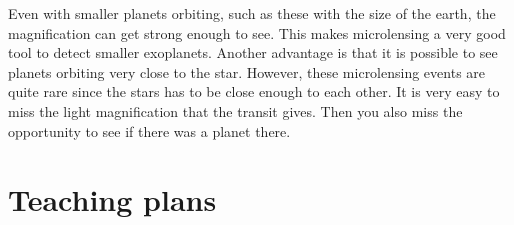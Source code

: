 \documentclass[12pt,a4paper,oneside]{scrartcl}
\begin{document}
Even with smaller planets orbiting, such as these with the size of the earth, the magnification can get strong enough to see. This makes microlensing a very good tool to detect smaller exoplanets. Another advantage is that it is possible to see planets orbiting very close to the star. However, these microlensing events are quite rare since the stars has to be close enough to each other. It is very easy to miss the light magnification that the transit gives. Then you also miss the opportunity to see if there was a planet there.  



\section{Teaching plans}
\end{document}
